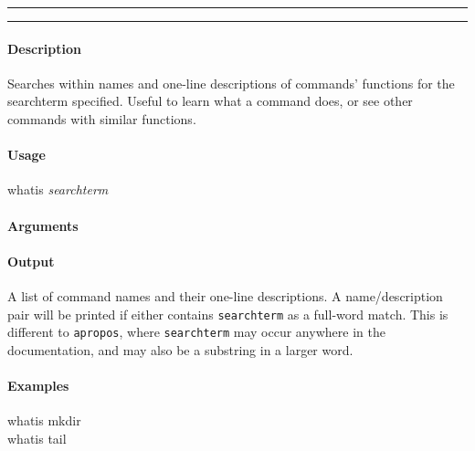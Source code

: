 \hrule
\vspace{1mm}
\hrule
\vspace{4mm}

\paragraph{Description}
\indentpar \raggedright \textrm{Searches within names and one-line descriptions of commands' functions for the searchterm specified. Useful to learn what a command does, or see other commands with similar functions.}\\

\paragraph{Usage}
\indentpar whatis \textit{searchterm}

\paragraph{Arguments}
\indentpar {}

\paragraph{Output}
\indentpar \textrm{A list of command names and their one-line descriptions. A name/description pair will be printed if either contains \texttt{searchterm} as a full-word match. This is different to \texttt{apropos}, where \texttt{searchterm} may occur anywhere in the documentation, and may also be a substring in a larger word.}


\paragraph{Examples}

\indentpar whatis mkdir\\
\indentpar whatis tail

\vspace{20mm}